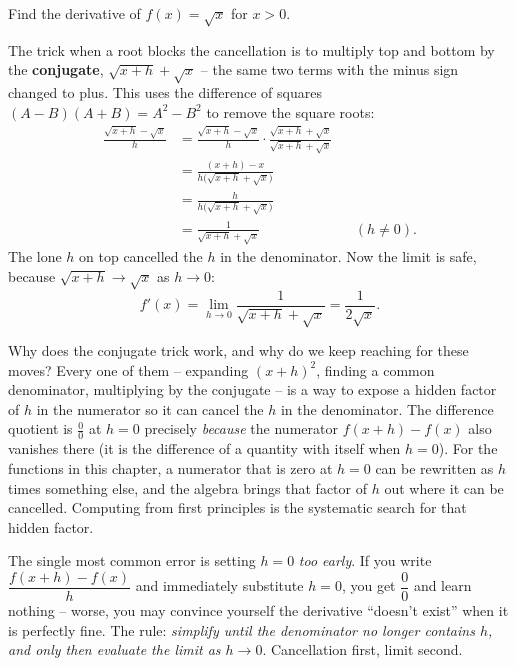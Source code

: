 \begin{example}
\label{ch10:ex-sqrt}
Find the derivative of $f(x) = \sqrt{x}$ for $x > 0$.
\end{example}

\noindent The trick when a root blocks the cancellation is to multiply top and
bottom by the \textbf{conjugate}, $\sqrt{x+h} + \sqrt{x}$ -- the same two terms
with the minus sign changed to plus. This uses the difference of
squares $(A - B)(A + B) = A^2 - B^2$ to remove the square roots:
\begin{align*}
  \frac{\sqrt{x + h} - \sqrt{x}}{h}
  &= \frac{\sqrt{x + h} - \sqrt{x}}{h}
     \cdot \frac{\sqrt{x + h} + \sqrt{x}}{\sqrt{x + h} + \sqrt{x}} \\[4pt]
  &= \frac{(x + h) - x}{h\bigl(\sqrt{x + h} + \sqrt{x}\bigr)} \\[4pt]
  &= \frac{h}{h\bigl(\sqrt{x + h} + \sqrt{x}\bigr)} \\[4pt]
  &= \frac{1}{\sqrt{x + h} + \sqrt{x}} && (h \neq 0).
\end{align*}
The lone $h$ on top cancelled the $h$ in the denominator. Now the limit is safe,
because $\sqrt{x+h} \to \sqrt{x}$ as $h \to 0$:
\[
  f'(x) = \lim_{h \to 0} \frac{1}{\sqrt{x + h} + \sqrt{x}}
        = \frac{1}{2\sqrt{x}}.
\]

\begin{whybox}
Why does the conjugate trick work, and why do we keep reaching for these
moves? Every one of them -- expanding $(x+h)^2$, finding a common
denominator, multiplying by the conjugate -- is a way to expose a hidden factor
of $h$ in the numerator so it can cancel the $h$ in the denominator. The
difference quotient is $\frac00$ at $h=0$ precisely \emph{because} the numerator
$f(x+h) - f(x)$ also vanishes there (it is the difference of a quantity with
itself when $h=0$). For the functions in this chapter, a numerator that is zero
at $h=0$ can be rewritten as $h$ times something else, and the algebra brings
that factor of $h$ out where it can be cancelled. Computing from first
principles is the systematic search for that hidden factor.
\end{whybox}

\begin{trapbox}
The single most common error is setting $h = 0$ \emph{too early}. If you write
$\dfrac{f(x+h)-f(x)}{h}$ and immediately substitute $h = 0$, you get
$\dfrac{0}{0}$ and learn nothing -- worse, you may convince yourself the
derivative ``doesn't exist'' when it is perfectly fine. The rule:
\emph{simplify until the denominator no longer contains $h$, and only then evaluate the limit as
$h \to 0$}. Cancellation first, limit second.
\end{trapbox}

